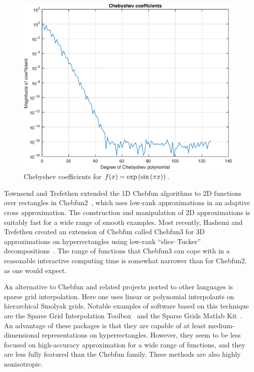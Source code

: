 \begin{figure}
	\centering
	\includegraphics[scale = 0.5]{Chapter1/coeff_plot.eps}
	\caption{Chebyshev coefficients for $f(x)=\exp \left( \sin \left( \pi x \right) \right)$.}
	\label{Coeff_example}
\end{figure}

Townsend and Trefethen extended the 1D Chebfun algorithms to 2D functions over rectangles in Chebfun2~\cite{townsend2013extension,Townsend2014}, which uses low-rank approximations in an adaptive cross approximation. The construction and manipulation of 2D approximations is suitably fast for a wide range of smooth examples. Most recently, Hashemi and Trefethen created an extension of Chebfun called Chebfun3 for 3D approximations on hyperrectangles using low-rank ``slice--Tucker'' decompositions~\cite{Hashemi2017}. The range of functions that Chebfun3 can cope with in a reasonable interactive computing time is somewhat narrower than for Chebfun2, as one would expect. 

An alternative to Chebfun and related projects ported to other languages is sparse grid interpolation. Here one uses linear or polynomial interpolants on hierarchical Smolyak grids. Notable examples of software based on this technique are the Sparse Grid Interpolation Toolbox~\cite{Klimke2005} and the Sparse Grids Matlab Kit~\cite{Back2011}. An advantage of these packages is that they are capable of at least medium-dimensional representations on hyperrectangles. However, they seem to be less focused on high-accuracy approximation for a wide range of functions, and they are less fully featured than the Chebfun family. These methods are also highly nonisotropic.

